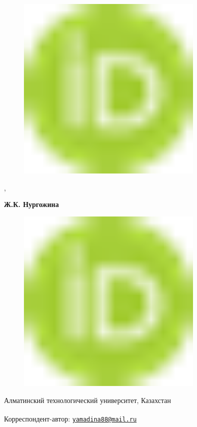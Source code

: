 \begin{figure}[H]
	\centering
	\includegraphics[width=0.8\textwidth]{media/pish/image10}
	\caption*{}
\end{figure}
,

{\bfseries Ж.К.
Нургожина}
\begin{figure}[H]
	\centering
	\includegraphics[width=0.8\textwidth]{media/pish/image10}
	\caption*{}
\end{figure}


Алматинский технологический университет, Казахстан

{\bfseries \textsuperscript{\envelope }}Корреспондент-автор:
\href{mailto:yamadina88@mail.ru}{\nolinkurl{yamadina88@mail.ru}}

